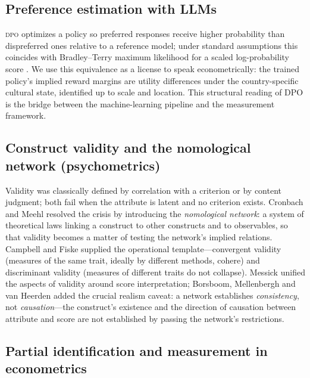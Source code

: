 \documentclass[11pt,letterpaper]{article}
\newcommand{\DPO}{\textsc{dpo}}
\begin{document}
\subsection{Preference estimation with LLMs}

\DPO{} \cite{rafailov2023} optimizes a policy so preferred responses receive higher probability than dispreferred ones relative to a reference model; under standard assumptions this coincides with Bradley--Terry maximum likelihood for a scaled log-probability score \cite{bradley1952,mcfadden1974}. We use this equivalence as a license to speak econometrically: the trained policy's implied reward margins are utility differences under the country-specific cultural state, identified up to scale and location. This structural reading of DPO is the bridge between the machine-learning pipeline and the measurement framework.

\subsection{Construct validity and the nomological network (psychometrics)}

Validity was classically defined by correlation with a criterion or by content judgment; both fail when the attribute is latent and no criterion exists. Cronbach and Meehl \cite{cronbach1955} resolved the crisis by introducing the \emph{nomological network}: a system of theoretical laws linking a construct to other constructs and to observables, so that validity becomes a matter of testing the network's implied relations. Campbell and Fiske \cite{campbell1959} supplied the operational template---convergent validity (measures of the same trait, ideally by different methods, cohere) and discriminant validity (measures of different traits do not collapse). Messick \cite{messick1995} unified the aspects of validity around score interpretation; Borsboom, Mellenbergh and van Heerden \cite{borsboom2004} added the crucial realism caveat: a network establishes \emph{consistency}, not \emph{causation}---the construct's existence and the direction of causation between attribute and score are not established by passing the network's restrictions.

\subsection{Partial identification and measurement in econometrics}
\end{document}

